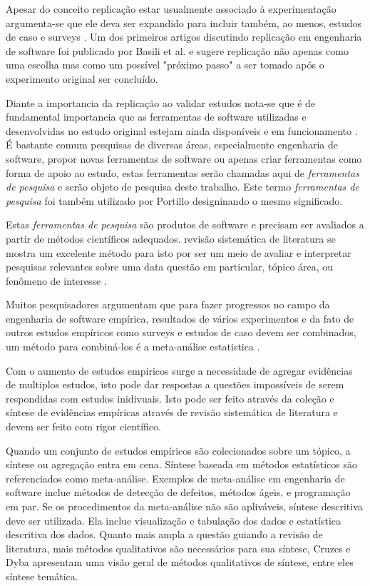 \documentclass[12pt]{article}
\begin{document}
Apesar do conceito replicação
estar usualmente associado à experimentação argumenta-se que ele deva ser
expandido para incluir também, ao menos, estudos de caso e surveys
\cite{Mantyla2010}. Um dos primeiros artigos discutindo replicação
em engenharia de software foi publicado por Basili et al.
\cite{Basili1986} e sugere replicação não apenas como uma escolha mas como um
possível "próximo passo" a ser tomado após o experimento original ser
concluído.

Diante a importancia da replicação ao validar estudos nota-se que é de
fundamental importancia que as ferramentas de software utilizadas e
desenvolvidas no estudo original estejam ainda disponíveis e em funcionamento
\cite{Kon11}. É bastante comum pesquisas de diversas áreas,
especialmente engenharia de software, propor novas ferramentas de
software ou apenas criar ferramentas como forma de apoio ao estudo, estas
ferramentas serão chamadas aqui de {\it ferramentas de
pesquisa} e serão objeto de pesquisa deste trabalho. Este termo {\it
ferramentas de pesquisa} foi também utilizado por Portillo\cite{Portillo12}
designinando o mesmo significado.

Estas {\it ferramentas de pesquisa} são produtos de software e precisam ser
avaliados a partir de métodos científicos adequados.
revisão sistemática de literatura se mostra um
excelente método para isto por ser um meio de avaliar e interpretar pesquisas
relevantes sobre uma data questão em particular, tópico área, ou fenômeno de
interesse \cite{Kitchenham2006}.

Muitos pesquisadores argumentam que para fazer progressos no campo da
engenharia de software empírica, resultados de vários experimentos e da fato
de outros estudos empíricos como surveys e estudos de caso devem ser
combinados, um método para combiná-los é a meta-análise estatistica
\cite{Almqvist2006}.

Com o aumento de estudos empíricos surge a necessidade de agregar evidências
de multiplos estudos, isto pode dar respostas a questões impossíveis de serem
respondidas com estudos inidivuais. Isto pode ser feito através da coleção e
síntese de evidências empíricas através de revisão sistemática de literatura e
devem ser feito com rigor científico.

Quando um conjunto de estudos empíricos são colecionados sobre um tópico, a
síntese ou agregação entra em cena. Síntese baseada em métodos estatísticos
são referenciados como meta-análise. Exemplos de meta-análise em engenharia de
software inclue métodos de detecção de defeitos, métodos ágeis, e programação
em par. Se os procedimentos da meta-análise não são apliváveis, síntese
descritiva deve ser utilizada. Ela inclue visualização e tabulação dos dados e
estatística descritiva dos dados. Quanto mais ampla a questão guiando a
revisão de literatura, mais métodos qualitativos são necessários para sua
síntese, Cruzes e Dyba \cite{Cruzes2011} apresentam uma visão geral de métodos
qualitativos de síntese, entre eles síntese temática.
\end{document}
